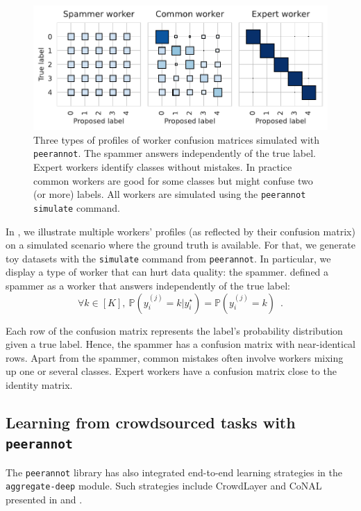 \begin{figure}[tbh]
    \centering
    \includegraphics[width=\textwidth]{./images_peerannot/fig-confusionmatrix-output-1.pdf}
    \caption{Three types of profiles of worker confusion matrices simulated with \texttt{peerannot}. The spammer answers independently of the true label. Expert workers identify classes without mistakes. In practice common workers are good for some classes but might confuse two (or more) labels. All workers are simulated using the \texttt{peerannot simulate} command. }
    \label{fig:confusionmatrix}
\end{figure}
In ,  we illustrate multiple workers' profiles (as reflected by their confusion matrix) on a simulated scenario where the ground truth is available. For that, we generate toy datasets with the \texttt{simulate} command from \texttt{peerannot}.
In particular, we display a type of worker that can hurt data quality: the spammer.
 defined a spammer as a worker that answers independently of the true label:
\begin{equation}\label{eq:spammer2}
    \forall k\in[K],\ \mathbb{P}(y_i^{(j)}=k|y_i^\star) = \mathbb{P}(y_i^{(j)}=k)\enspace.
\end{equation}

Each row of the confusion matrix represents the label's probability distribution given a true label. Hence, the spammer has a confusion matrix with near-identical rows.
Apart from the spammer, common mistakes often involve workers mixing up one or several classes.
Expert workers have a confusion matrix close to the identity matrix.

\subsection{Learning from crowdsourced tasks with \texttt{peerannot}}
\label{subsec:learning_peerannot}

The \texttt{peerannot} library has also integrated end-to-end learning strategies in the \texttt{aggregate-deep} module.
Such strategies include CrowdLayer and CoNAL presented in  and .

